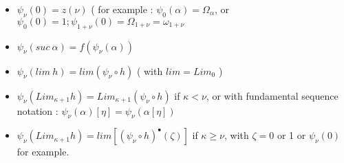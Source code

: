 \documentclass[10pt]{article}
\begin{document}
\begin{comment}
\begin{itemize}
     \setlength{\itemsep}{1pt}
     \setlength{\parskip}{0pt}
     \setlength{\parsep}{0pt}

\item \( \psi_\nu(0) = z(\nu) \) ( for example : \( \psi_0(0) = 1; \psi_{1+\nu}(0) = \Omega_{1+\nu} = \omega_{1+\nu} \) 

\item \( \psi_\nu(suc\ \alpha) = f(\psi_\nu(\alpha)) \) 

\item \( \psi_\nu(Lim_\kappa h) = Lim_\kappa(\psi_\nu \circ h) \) if \( \kappa < 1+\nu \), 
 or with fundamental sequence notation : \( \psi_\nu(\alpha)[\eta] = \psi_\nu(\alpha[\eta]) \)

\item \( \psi_\nu(Lim_{1+\nu} h) = lim [ (\psi_\nu \circ h)^\bullet (\zeta) ] \) with \( \zeta = 0 \) or 1 or \( \psi_\nu(0) \) for example.

\end{itemize}
\end{comment}

\begin{itemize}
     \setlength{\itemsep}{1pt}
     \setlength{\parskip}{0pt}
     \setlength{\parsep}{0pt}

\item \( \psi_\nu(0) = z(\nu) \) ( for example : \( \psi_0(\alpha) = \Omega_\alpha \), or \( \psi_0(0) = 1; \psi_{1+\nu}(0) = \Omega_{1+\nu} = \omega_{1+\nu} \) 

\item \( \psi_\nu(suc\ \alpha) = f(\psi_\nu(\alpha)) \) 

\item \( \psi_\nu(lim\ h) = lim(\psi_\nu \circ h) \) ( with \( lim = Lim_0 \) )

\item \( \psi_\nu(Lim_{\kappa+1} h) = Lim_{\kappa+1}(\psi_\nu \circ h) \) if \( \kappa < \nu \), 
 or with fundamental sequence notation : \( \psi_\nu(\alpha)[\eta] = \psi_\nu(\alpha[\eta]) \)

\item \( \psi_\nu(Lim_{\kappa+1} h) = lim [ (\psi_\nu \circ h)^\bullet (\zeta) ] \) if \( \kappa \ge \nu \), with \( \zeta = 0 \) or 1 or \( \psi_\nu(0) \) for example.

\end{itemize}

\begin{comment}
(We could also define \( \psi_\nu(\alpha) \) where \( \nu \) is an ordinal, provided that z is a function that, given an ordinal, gives an ordinal, and that we define \( Lim_\kappa \) for \( \kappa \) ordinal.)
\end{comment}
\end{document}
